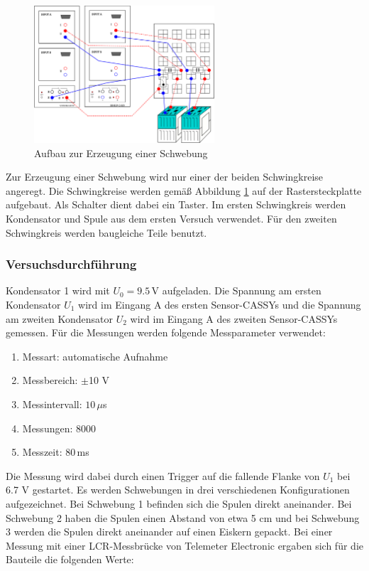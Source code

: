 \begin{figure}[H]
\centering
\includegraphics[width=0.6\textwidth]{bilder/aufbau_schwebung.png}
\caption{Aufbau zur Erzeugung einer Schwebung}
\label{abb:aufbau_schweb}
\end{figure}

Zur Erzeugung einer Schwebung wird nur einer der beiden Schwingkreise angeregt. Die Schwingkreise werden gemäß Abbildung \ref{abb:aufbau_schweb} auf der Rastersteckplatte aufgebaut. Als Schalter dient dabei ein Taster. Im ersten Schwingkreis werden Kondensator und Spule aus dem ersten Versuch verwendet. Für den zweiten Schwingkreis werden baugleiche Teile benutzt.


\subsubsection{Versuchsdurchführung}

Kondensator 1 wird mit $U_0 = 9.5 \, \mathrm V$ aufgeladen. Die Spannung am ersten Kondensator $U_1$ wird im Eingang A des ersten Sensor-CASSYs und die Spannung am zweiten Kondensator $U_2$ wird im Eingang A des zweiten Sensor-CASSYs gemessen. Für die Messungen werden folgende Messparameter verwendet:

\begin{enumerate}[-]
\setlength{\itemsep}{-5pt} 
\item Messart: automatische Aufnahme
\item Messbereich: $\pm$10 V
\item Messintervall: $10\,\mu$s 
\item Messungen: $8000$
\item Messzeit: $80\,$ms
\end{enumerate}

Die Messung wird dabei durch einen Trigger auf die fallende Flanke von $U_1$ bei 6.7 V gestartet. Es werden Schwebungen in drei verschiedenen Konfigurationen aufgezeichnet. Bei Schwebung 1 befinden sich die Spulen direkt aneinander. Bei Schwebung 2 haben die Spulen einen Abstand von etwa 5 cm und bei Schwebung 3 werden die Spulen direkt aneinander auf einen Eiskern gepackt. Bei einer Messung mit einer LCR-Messbrücke von Telemeter Electronic ergaben sich für die Bauteile die folgenden Werte:

